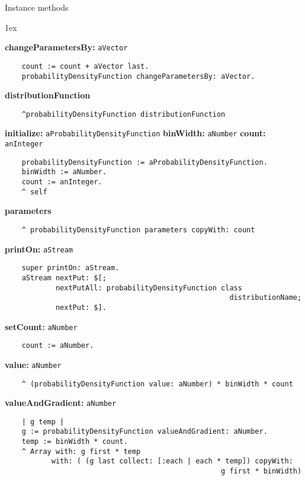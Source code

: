 Instance methods
{\parskip 1ex\par\noindent}
{\bf changeParametersBy:} {\tt aVector}
\begin{verbatim}
    count := count + aVector last.
    probabilityDensityFunction changeParametersBy: aVector.
\end{verbatim}
{\bf distributionFunction}
\begin{verbatim}
    ^probabilityDensityFunction distributionFunction
\end{verbatim}
{\bf initialize:} {\tt aProbabilityDensityFunction} {\bf binWidth:} {\tt aNumber} {\bf count:} {\tt anInteger}
\begin{verbatim}
    probabilityDensityFunction := aProbabilityDensityFunction.
    binWidth := aNumber.
    count := anInteger.
    ^ self
\end{verbatim}
{\bf parameters}
\begin{verbatim}
    ^ probabilityDensityFunction parameters copyWith: count
\end{verbatim}
{\bf printOn:} {\tt aStream}
\begin{verbatim}
    super printOn: aStream.
    aStream nextPut: $[;
            nextPutAll: probabilityDensityFunction class 
                                                     distributionName;
            nextPut: $].
\end{verbatim}
{\bf setCount:} {\tt aNumber}
\begin{verbatim}
    count := aNumber.
\end{verbatim}
{\bf value:} {\tt aNumber}
\begin{verbatim}
    ^ (probabilityDensityFunction value: aNumber) * binWidth * count
\end{verbatim}
{\bf valueAndGradient:} {\tt aNumber}
\begin{verbatim}
    | g temp |
    g := probabilityDensityFunction valueAndGradient: aNumber.
    temp := binWidth * count.
    ^ Array with: g first * temp
           with: ( (g last collect: [:each | each * temp]) copyWith: 
                                                   g first * binWidth)
\end{verbatim}

